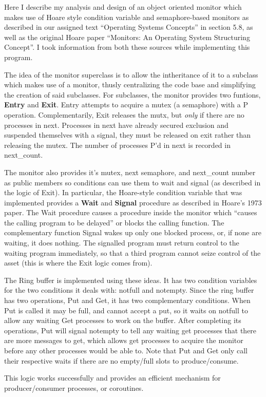 \documentclass[11pt]{article}
\begin{document}
\begin{question}

    Here I describe my analysis and design of an object oriented monitor which makes use of Hoare style condition variable and semaphore-based monitors as described in our assigned text ``Operating Systems Concepts'' in section 5.8, as well as the original Hoare paper ``Monitors: An Operating System Structuring Concept''. I took information from both these sources while implementing this program.

    The idea of the monitor superclass is to allow the intheritance of it to a subclass which makes use of a monitor, thusly centralizing the code base and simplifying the creation of said subclasses. For subclasses, the monitor provides two funtions, {\bf  Entry} and {\bf Exit}. Entry attempts to acquire a mutex (a semaphore) with a P operation. Complementarily, Exit releases the mutx, but {\it only} if there are no processes in next. Processes in next have already secured exclusion and suspended themselves with a signal, they must be released on exit rather than releasing the mutex. The number of processes P'd in next is recorded in next\_count.

    The monitor also provides it's mutex, next semaphore, and next\_count number as public members so conditions can use them to wait and signal (as described in the logic of Exit). In particular, the Hoare-style condition variable that was implemented provides a {\bf Wait} and {\bf Signal} procedure as described in Hoare's 1973 paper. The Wait procedure causes a procedure inside the monitor which ``causes the calling program to be delayed'' or blocks the calling function. The complementary function Signal wakes up only one blocked process, or, if none are waiting, it does nothing. The signalled program must return control to the waiting program immediately, so that a third program cannot seize control of the asset (this is where the Exit logic comes from).

    The Ring buffer is implemented using these ideas. It has two condition variables for the two conditions it deals with: notfull and notempty. Since the ring buffer has two operations, Put and Get, it has two complementary conditions. When Put is called it may be full, and cannot accept a put, so it waits on notfull to allow any waiting Get processes to work on the buffer. After completing its operations, Put will signal notempty to tell any waiting get processes that there are more messages to get, which allows get processes to acquire the monitor before any other processes would be able to. Note that Put and Get only call their respective waits if there are no empty/full slots to produce/consume.

    This logic works successfully and provides an efficient mechanism for producer/consumer processes, or coroutines.

\end{question}
\end{document}
